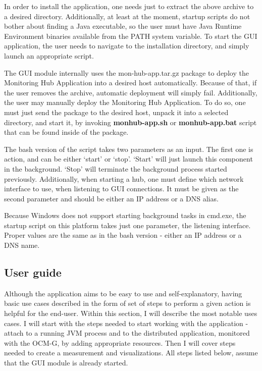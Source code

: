 In order to install the application, one needs just to extract the above archive to a desired directory. Additionally, at least at the moment, startup scripts do not bother about finding a Java executable, so the user must have Java Runtime Environment binaries available from the PATH system variable. To start the GUI application, the user needs to navigate to the installation directory, and simply launch an appropriate script.

The GUI module internally uses the mon-hub-app.tar.gz package to deploy the Monitoring Hub Application into a desired host automatically. Because of that, if the user removes the archive, automatic deployment will simply fail. Additionally, the user may manually deploy the Monitoring Hub Application. To do so, one must just send the package to the desired host, unpack it into a selected directory, and start it, by invoking  {\bf monhub-app.sh} or {\bf monhub-app.bat} script that can be found inside of the package.

The bash version of the script takes two parameters as an input. The first one is action, and can be either \lq{}start\rq{} or \lq{}stop\rq{}. \lq{}Start\rq{} will just launch this component in the background. \lq{}Stop\rq{} will terminate the background process started previously. Additionally, when starting a hub, one must define which network interface to use, when listening to GUI connections. It must be given as the second parameter and should be either an IP address or a DNS alias.

Because Windows does not support starting background tasks in cmd.exe, the startup script on this platform takes just one parameter, the listening interface. Proper values are the same as in the bash version - either an IP address or a DNS name.

\subsection{User guide}

Although the application aims to be easy to use and self-explanatory, having basic use cases described in the form of set of steps to perform a given action is helpful for the end-user. Within this section, I will describe the most notable uses cases. I will start with the steps needed to start working with the application - attach to a running JVM process and to the distributed application, monitored with the OCM-G, by adding appropriate resources. Then I will cover steps needed to create a measurement and visualizations. All steps listed below, assume that the GUI module is already started.


